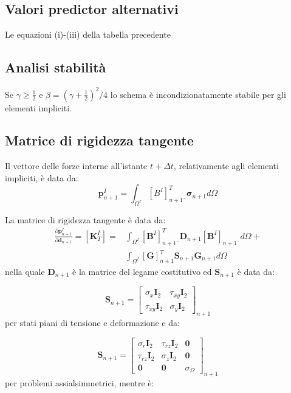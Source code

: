 \subsection{Valori predictor alternativi}
Le equazioni (i)-(iii) della tabella precedente

\subsection{Analisi stabilità}
Se $\gamma \geq \frac{1}{2}$ e $\beta=(\gamma + \frac{1}{2})^2/4$ lo schema è incondizionatamente stabile per gli elementi impliciti. 

\subsection{Matrice di rigidezza tangente}
Il vettore delle forze interne all'istante $t + \varDelta t$, relativamente agli elementi impliciti, è data da:
\begin{equation}
	\boldsymbol{p}_{n+1}^I = \int_{\varOmega^I}[B^I]_{n+1¯}^T\boldsymbol{\sigma}_{n+1}d\varOmega
\end{equation}

La matrice di rigidezza tangente è data da:
\begin{equation}
	\begin{split}
	\frac{\partial \boldsymbol{p}_{n+1}^I}{\partial \boldsymbol{d}_{n+1}} = [\boldsymbol{K}_T^I] = & 
	 \int_{\varOmega^I}[\boldsymbol{B}^I]_{n+1¯}^T\boldsymbol{D}_{n+1} [\boldsymbol{B}^I]_{n+1¯} d\varOmega + \\ 
	 & \int_{\varOmega^I} [\boldsymbol{G}]_{n+1}^T \boldsymbol{S}_{n+1} \boldsymbol{G}_{n+1} d\varOmega
 	\end{split}
\end{equation}
nella quale $\boldsymbol{D}_{n+1}$ è la matrice del legame costitutivo ed $\boldsymbol{S}_{n+1}$ è data da:

\begin{equation}
	\boldsymbol{S}_{n+1} = 
	\begin{bmatrix}
	    \sigma_x \mathbf{I}_2  & \tau_{xy} \mathbf{I}_2	\\
	    \tau_{xy} \mathbf{I}_2 & \sigma_y  \mathbf{I}_2                
	\end{bmatrix}_{n+1}
\end{equation}
per stati piani di tensione e deformazione e da:

\begin{equation}
	\boldsymbol{S}_{n+1} = 
	\begin{bmatrix}
		\sigma_r \mathbf{I}_2  & \tau_{rz} \mathbf{I}_2	& \mathbf{0} \\
		\tau_{rz} \mathbf{I}_2 & \sigma_z  \mathbf{I}_2	& \mathbf{0} \\
		\mathbf{0}             & \mathbf{0}             & \sigma_\Omega                
	\end{bmatrix}_{n+1}
\end{equation}
per problemi assialsimmetrici, mentre è:

